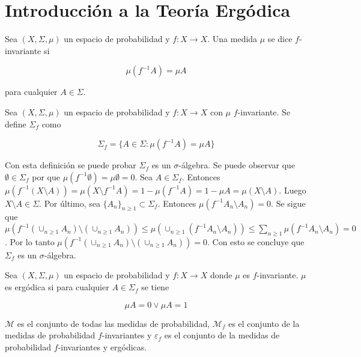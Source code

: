\section{Introducción a la Teoría Ergódica}

\begin{definicion}
	Sea $(X,\Sigma,\mu)$ un espacio de probabilidad y $f: X \rightarrow X$. Una medida $\mu$ se dice $f$-invariante si
	
	\begin{equation}
		\mu(f^{-1}A) = \mu A
	\end{equation}
	
	para cualquier $A \in \Sigma$.
\end{definicion}

\begin{definicion}
	Sea $(X,\Sigma,\mu)$ un espacio de probabilidad y $f: X \rightarrow X$ con $\mu$ $f$-invariante. Se define $\Sigma_f$ como
	
	\begin{equation}
		\Sigma_f = \{ A \in \Sigma: \mu(f^{-1}A) = \mu A \}
	\end{equation}
\end{definicion}

Con esta definición se puede probar $\Sigma_f$ es un $\sigma$-álgebra. Se puede observar que $\emptyset \in \Sigma_f$ por que $\mu(f^{-1} \emptyset) = \mu \emptyset = 0$. Sea $A \in \Sigma_f$. Entonces $\mu(f^{-1}(X \setminus A)) =  \mu(X \setminus f^{-1}A) = 1 - \mu(f^{-1}A) = 1 - \mu A = \mu(X \setminus A)$. Luego $X \setminus A \in \Sigma$. Por último, sea $\{A_n\}_{n \geq 1} \subset \Sigma_f$. Entonces $\mu(f^{-1}A_n \setminus A_n) = 0$. Se sigue que $\mu(f^{-1}(\cup_{n \geq 1} A_n) \setminus (\cup_{n \geq 1} A_n)) \leq \mu(\cup_{n \geq 1} (f^{-1}A_n \setminus A_n)) \leq \sum_{n \geq 1} \mu(f^{-1}A_n \setminus A_n) = 0$. Por lo tanto $\mu(f^{-1}(\cup_{n \geq 1} A_n) \setminus (\cup_{n \geq 1} A_n)) = 0$. Con esto se concluye que $\Sigma_f$ es un $\sigma$-álgebra. 

\begin{definicion}
	Sea $(X,\Sigma,\mu)$ un espacio de probabilidad y $f: X \rightarrow X$ donde $\mu$ es $f$-invariante. $\mu$ es ergódica si para cualquier $A \in \Sigma_f$ se tiene
	
	\begin{equation}
		\mu A = 0 \vee \mu A = 1
	\end{equation}
\end{definicion}

\begin{definicion}
	$\mathcal{M}$ es el conjunto de todas las medidas de probabilidad, $\mathcal{M}_f$ es el conjunto de la medidas de probabilidad $f$-invariantes y $\varepsilon_f$ es el conjunto de la medidas de probabilidad $f$-invariantes y ergódicas.
\end{definicion}


